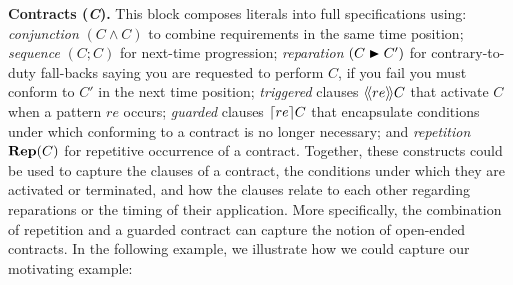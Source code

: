 \documentclass{article}
\begin{document}
  \medskip
  \noindent\textbf{Contracts (\emph{C}).}
  This block composes literals into full specifications using:
  \emph{conjunction} \((C \wedge C)\) to combine requirements in the same time position;
  \emph{sequence} \((C;C)\) for next-time progression;
  \emph{reparation} \((C \repair C')\) for contrary-to-duty fall-backs saying you are requested to perform $C$, if you fail you must conform to $C'$ in the next time position;
  \emph{triggered} clauses \(\trig[re]{C}\) that activate \(C\) when a pattern \(re\) occurs;
  \emph{guarded} clauses \(\guard[re]{C}\) that encapsulate conditions under which conforming to a contract is no longer necessary; and
  \emph{repetition} \(\repit{C}\) for repetitive occurrence of a contract.
  Together, these constructs could be used to capture the clauses of a contract, the conditions under which they are activated or terminated, and how the clauses relate to each other regarding reparations or the timing of their application. More specifically, the combination of repetition and a guarded contract can capture the notion of open-ended contracts.
   In the following example, we illustrate how we could capture our motivating example:
\end{document}
